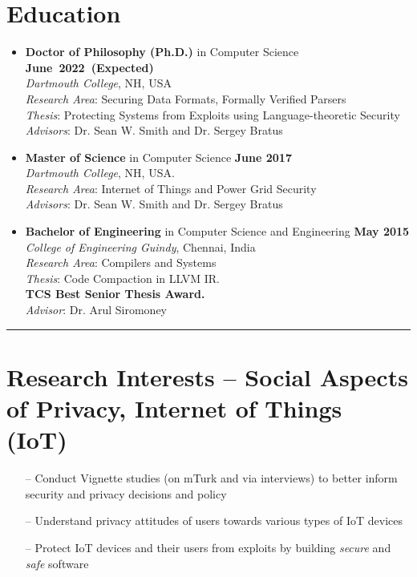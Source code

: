 \documentclass[letterpaper,10pt]{article}
\begin{document}
\section*{\color{dartmouthgreen} Education}
\begin{itemize}
  \setlength\itemsep{0.5ex}
  \item \textbf{Doctor of Philosophy (Ph.D.)} in Computer Science \mbox{}\hfill \textbf{June~2022~(Expected)}\\
    \textit{Dartmouth College}, NH, USA\\
    \textit{Research Area}: Securing Data Formats, Formally Verified Parsers\\
    \textit{Thesis}: Protecting Systems from Exploits using Language-theoretic Security\\
    \textit{Advisors}: Dr. Sean W. Smith and Dr. Sergey Bratus
  \item \textbf{Master of Science} in Computer Science \mbox{}\hfill \textbf{June 2017}\\
    \textit{Dartmouth College}, NH, USA.\\
    \textit{Research Area}: Internet of Things and Power Grid Security\\
    \textit{Advisors}: Dr. Sean W. Smith and Dr. Sergey Bratus
  \item \textbf{Bachelor of Engineering} in Computer Science and Engineering \mbox{}\hfill \textbf{May 2015}\\ 
    \textit{College of Engineering Guindy}, Chennai, India\\
    \textit{Research Area}: Compilers and Systems\\
    \textit{Thesis}: Code Compaction in LLVM IR.\\
    \textbf{TCS Best Senior Thesis Award.}\\
    \textit{Advisor}: Dr. Arul Siromoney
\end{itemize}

\hrule
\section*{\color{dartmouthgreen} Research Interests -- Social Aspects of Privacy, Internet of Things (IoT)}

\begin{itemize}
  \item[--] Conduct Vignette studies (on mTurk and via interviews) to better inform security and privacy decisions and policy
  \item[--] Understand privacy attitudes of users towards various types of IoT devices
  \item[--] Protect IoT devices and their users from exploits by building \textit{secure} and \textit{safe} software
\end{itemize}
\end{document}
